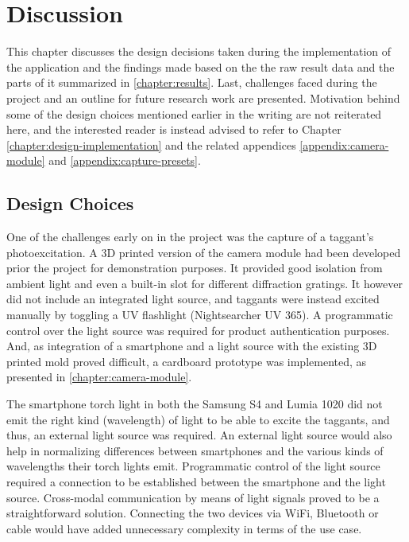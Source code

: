 \documentclass[thesis.tex]{subfiles}
\begin{document}
\chapter{Discussion}
\label{chapter:discussion}

This chapter discusses the design decisions taken during the implementation of the application and the findings made based on the the raw result data and the parts of it summarized in \ref{chapter:results}. Last, challenges faced during the project and an outline for future research work are presented. Motivation behind some of the design choices mentioned earlier in the writing are not reiterated here, and the interested reader is instead advised to refer to Chapter \ref{chapter:design-implementation} and the related appendices \ref{appendix:camera-module} and \ref{appendix:capture-presets}.

\section{Design Choices}

One of the challenges early on in the project was the capture of a taggant's photoexcitation. A 3D printed version of the camera module had been developed prior the project for demonstration purposes. It provided good isolation from ambient light and even a built-in slot for different diffraction gratings. It however did not include an integrated light source, and taggants were instead excited manually by toggling a UV flashlight (Nightsearcher UV 365). A programmatic control over the light source was required for product authentication purposes. And, as integration of a smartphone and a light source with the existing 3D printed mold proved difficult, a cardboard prototype was implemented, as presented in \ref{chapter:camera-module}.

The smartphone torch light in both the Samsung S4 and Lumia 1020 did not emit the right kind (wavelength) of light to be able to excite the taggants, and thus, an external light source was required. An external light source would also help in normalizing differences between smartphones and the various kinds of wavelengths their torch lights emit. Programmatic control of the light source required a connection to be established between the smartphone and the light source. Cross-modal communication by means of light signals proved to be a straightforward solution. Connecting the two devices via WiFi, Bluetooth or cable would have added unnecessary complexity in terms of the use case.
\end{document}

